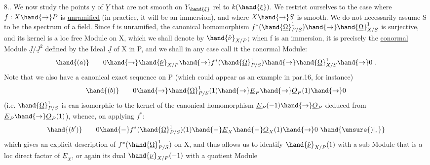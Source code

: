 
8.. We now study the points y of $\underline{Y}$ that are not smooth
on $Y_{\hand{\xi}}$ rel to $k(\hand{\xi})$. We restrict ourselves to the case where $f:X\hand{\to} P$ is \uline{unramified}
(in practice, it will be an immersion), and where $X\hand{\to} S$ is smooth. We do not
necessarily assume S to be the spectrum of a field. 
 Since
f is unramified, the canonical homomorphism $f^*(\hand{\underline{\Omega}}^1_{P/S})\hand{\to}\hand{\underline{\Omega}}^1_{X/S}$
is surjective, and its kernel is a loc free Module on X, which we
shall denote by $\hand{\check{\nu}}_{X/P}$; when f is an immersion, it is precisely the
\uline{conormal} Module $\underline{J}/\underline{J}^2$ defined by the Ideal $\underline{J}$ of X in P, and we shall
in any case call it the conormal Module:
\[ \hand{(a)} \qquad 0\hand{\to}\hand{\check{\underline{\nu}}}_{X/P}\hand{\to} f^*(\hand{\underline{\Omega}}^1_{P/S})\hand{\to}\hand{\underline{\Omega}}^1_{X/S}\hand{\to} 0 \ . \]
Note that we also have a canonical exact sequence on P
(which could appear as an example in par.16, for instance)
\[ \hand{(b)} \qquad 0\hand{\to}\hand{\underline{\Omega}}^1_{P/S}(1)\hand{\to}\underline{E}_P\hand{\to}\underline{O}_P(1)\hand{\to} 0 \]
(i.e. $\hand{\underline{\Omega}}^1_{P/S}$ is can isomorphic to the kernel of the canonical homomorphism
$\underline{E}_P(-1)\hand{\to}\underline{O}_P$ deduced from $\underline{E}_P\hand{\to}\underline{O}_P(1)$), whence, on applying $f^*$:
\[ \hand{(b')} \qquad 0 \hand{-} f^*(\hand{\underline{\Omega}}^1_{P/S})(1) \hand{-} \underline{E}_X \hand{-} \underline{O}_X(1)\hand{\to} 0 \ \hand{\unsure{)|,}} \]
which gives an explicit description of $f^*(\hand{\underline{\Omega}}^1_{P/S})$  on X, and
thus allows us to identify $\hand{\check{\underline{\nu}}}_{X/P}(1)$ with a sub-Module that is a loc direct factor
of $\underline{E}_X$, or again its  dual $\hand{\underline{\nu}}_{X/P}(-1)$ with a quotient Module
